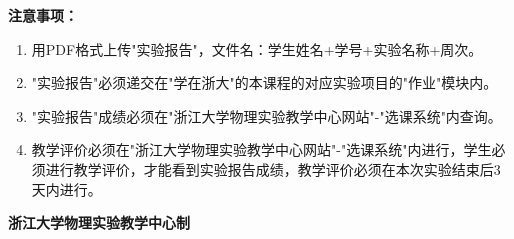 \documentclass[a4paper,12pt]{article}
\begin{document}
{\fontsize{12pt}{18pt}\selectfont
\textbf{注意事项：}
\begin{enumerate}[label=\arabic*., leftmargin=2em, nosep]
    \item 用PDF格式上传"实验报告"，文件名：学生姓名+学号+实验名称+周次。
    \item "实验报告"必须递交在"学在浙大"的本课程的对应实验项目的"作业"模块内。
    \item "实验报告"成绩必须在"浙江大学物理实验教学中心网站"-"选课系统"内查询。
    \item 教学评价必须在"浙江大学物理实验教学中心网站"-"选课系统"内进行，学生必须进行教学评价，才能看到实验报告成绩，教学评价必须在本次实验结束后3天内进行。
\end{enumerate}
}

\vspace{0.5cm}
\begin{center}
    {\fontsize{12pt}{18pt}\selectfont \textbf{浙江大学物理实验教学中心制}}
\end{center}
\end{document}
